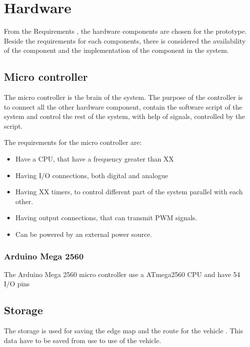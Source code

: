 \section{Hardware}
From the Requirements , the hardware components are chosen for the prototype. Beside the requirements for each components, there is considered the availability of the component and the implementation of the component in the system.

\subsection{Micro controller}
The micro controller is the brain of the system. The purpose of the controller is to connect all the other hardware component, contain the software script of the system and control the rest of the system, with help of signals, controlled by the script.

The requirements for the micro controller are:
\begin{itemize}
\item Have a CPU, that have a frequency greater than XX 
\item Having I/O connections, both digital and analogue 
\item Having XX  timers, to control different part of the system parallel with each other.
\item Having output connections, that can transmit PWM signals.
\item Can be powered by an external power source.
\end{itemize} 

\subsubsection{Arduino Mega 2560}
The Arduino Mega 2560 micro controller use a ATmega2560 CPU and have 54 I/O pins



\subsection{Storage}
The storage is used for saving the edge map and the route for the vehicle . This data have to be saved from use to use of the vehicle. 

